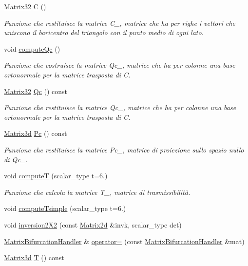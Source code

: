 \begin{DoxyCompactItemize}
\hyperlink{Core_8h_aee82131e398edee47a44d675ee802368}{Matrix32} \hyperlink{classMatrixBifurcationHandler_a4701fef8d864cb7d61521c8fbe5db2cc}{C} ()
\begin{DoxyCompactList}\small\item\em Funzione che restituisce la matrice C\-\_\-, matrice che ha per righe i vettori che uniscono il baricentro del triangolo con il punto medio di ogni lato. \end{DoxyCompactList}\item 
void \hyperlink{classMatrixBifurcationHandler_a203b6bfcdef418ffa927aebaeedc6da2}{compute\-Qc} ()
\begin{DoxyCompactList}\small\item\em Funzione che costruisce la matrice Qc\-\_\-, matrice che ha per colonne una base ortonormale per la matrice trasposta di C. \end{DoxyCompactList}\item 
\hyperlink{Core_8h_aee82131e398edee47a44d675ee802368}{Matrix32} \hyperlink{classMatrixBifurcationHandler_add50b813d3bd773ddf794c4e05b37e38}{Qc} () const 
\begin{DoxyCompactList}\small\item\em Funzione che restituisce la matrice Qc\-\_\-, matrice che ha per colonne una base ortonormale per la matrice trasposta di C. \end{DoxyCompactList}\item 
\hyperlink{Core_8h_acd816705c6602062b91975525c4e3f6f}{Matrix3d} \hyperlink{classMatrixBifurcationHandler_ad84675e9be6d56de69c0e25bf1cd77cd}{Pc} () const 
\begin{DoxyCompactList}\small\item\em Funzione che restituisce la matrice Pc\-\_\-, matrice di proiezione sullo spazio nullo di Qc\-\_\-. \end{DoxyCompactList}\item 
void \hyperlink{classMatrixBifurcationHandler_a46ee3c60eedda32abe36700ab2ce2d16}{compute\-T} (scalar\-\_\-type t=6.)
\begin{DoxyCompactList}\small\item\em Funzione che calcola la matrice T\-\_\-, matrice di trasmissibilità. \end{DoxyCompactList}\item 
void \hyperlink{classMatrixBifurcationHandler_a2153adb36bdbba82ca18ae74eb9e2ea7}{compute\-Tsimple} (scalar\-\_\-type t=6.)
\item 
void \hyperlink{classMatrixBifurcationHandler_acafb7a17c3d639068938a21dad6bb0ec}{inversion2\-X2} (const \hyperlink{Core_8h_a1694976dd66ed00e5f0618f4f8821163}{Matrix2d} \&invk, scalar\-\_\-type det)
\item 
\hyperlink{classMatrixBifurcationHandler}{Matrix\-Bifurcation\-Handler} \& \hyperlink{classMatrixBifurcationHandler_a2d67172a5034f104d08cb53e5dbda926}{operator=} (const \hyperlink{classMatrixBifurcationHandler}{Matrix\-Bifurcation\-Handler} \&mat)
\item 
\hyperlink{Core_8h_acd816705c6602062b91975525c4e3f6f}{Matrix3d} \hyperlink{classMatrixBifurcationHandler_a3b7305f6106add811e7b4b69f5642e86}{T} () const 
\end{DoxyCompactItemize}


